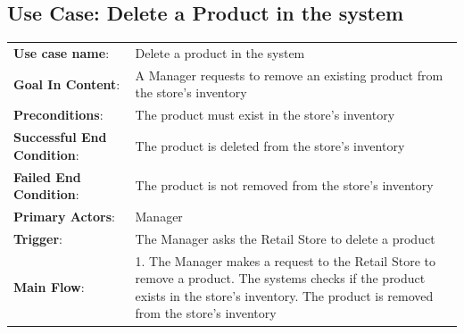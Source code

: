 \documentclass[12pt]{article}
\begin{document}
\subsection*{Use Case: Delete a Product in the system}
\begin{center}
\begin{tabular}{ l p{} }
    \textbf{Use case name}: & Delete a product in the system \\
    \textbf{Goal In Content}: & A Manager requests to remove an existing product from the store’s inventory \\
    \textbf{Preconditions}: & The product must exist in the store’s inventory \\
    \textbf{Successful End Condition}: & The product is deleted from the store’s inventory \\
    \textbf{Failed End Condition}: & The product is not removed from the store’s inventory  \\
    \textbf{Primary Actors}: & Manager  \\
    \textbf{Trigger}: & The Manager asks the Retail Store to delete a product  \\
    \textbf{Main Flow}: & 1. The Manager makes a request to the Retail Store to remove a product\newline 2. The systems checks if the product exists in the store’s inventory\newline 3. The product is removed from the store’s inventory
\end{tabular}
\end{center}
\end{document}
